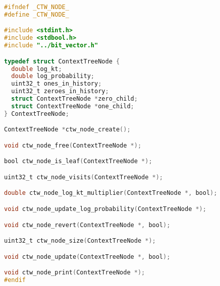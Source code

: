 \documentclass[fancychapters]{report}   	%
\begin{document}
\begin{lstlisting}[language=C,caption={context_tree_node.h}]
#ifndef _CTW_NODE_
#define _CTW_NODE_

#include <stdint.h>
#include <stdbool.h>
#include "../bit_vector.h"

typedef struct ContextTreeNode {
  double log_kt;
  double log_probability;
  uint32_t ones_in_history;
  uint32_t zeroes_in_history;
  struct ContextTreeNode *zero_child;
  struct ContextTreeNode *one_child;
} ContextTreeNode;

ContextTreeNode *ctw_node_create();

void ctw_node_free(ContextTreeNode *);

bool ctw_node_is_leaf(ContextTreeNode *);

uint32_t ctw_node_visits(ContextTreeNode *);

double ctw_node_log_kt_multiplier(ContextTreeNode *, bool);

void ctw_node_update_log_probability(ContextTreeNode *);

void ctw_node_revert(ContextTreeNode *, bool);

uint32_t ctw_node_size(ContextTreeNode *);

void ctw_node_update(ContextTreeNode *, bool);

void ctw_node_print(ContextTreeNode *);
#endif
\end{lstlisting}
\end{document}
